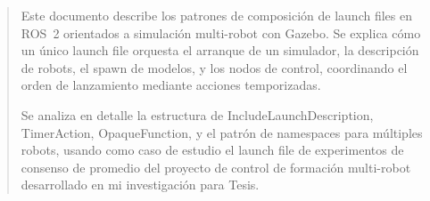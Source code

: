 \begin{abstract}
Este documento describe los patrones de composición de launch files en ROS~2 orientados a simulación multi-robot con Gazebo. Se explica cómo un único launch file orquesta el arranque de un simulador, la descripción de robots, el spawn de modelos, y los nodos de control, coordinando el orden de lanzamiento mediante acciones temporizadas.

Se analiza en detalle la estructura de IncludeLaunchDescription, TimerAction, OpaqueFunction, y el patrón de namespaces para múltiples robots, usando como caso de estudio el launch file de experimentos de consenso de promedio del proyecto de control de formación multi-robot desarrollado en mi investigación para Tesis.
\end{abstract}
